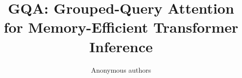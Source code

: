 \title{\textbf{GQA: Grouped-Query Attention for Memory-Efficient Transformer Inference}}

\author{Anonymous authors}
